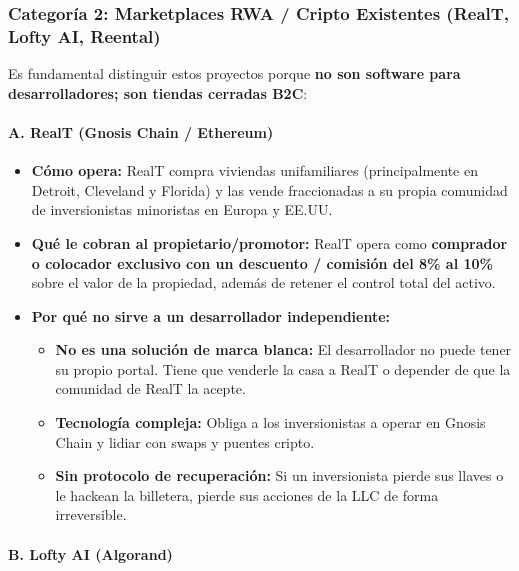 \documentclass[
]{article}
\providecommand{\tightlist}{%
  \setlength{\itemsep}{0pt}\setlength{\parskip}{0pt}}
\begin{document}
\subsubsection{Categoría 2: Marketplaces RWA / Cripto Existentes (RealT,
Lofty AI,
Reental)}\label{categoruxeda-2-marketplaces-rwa-cripto-existentes-realt-lofty-ai-reental}

Es fundamental distinguir estos proyectos porque \textbf{no son software
para desarrolladores; son tiendas cerradas B2C}:

\paragraph{A. RealT (Gnosis Chain /
Ethereum)}\label{a.-realt-gnosis-chain-ethereum}

\begin{itemize}
\tightlist
\item
  \textbf{Cómo opera:} RealT compra viviendas unifamiliares
  (principalmente en Detroit, Cleveland y Florida) y las vende
  fraccionadas a su propia comunidad de inversionistas minoristas en
  Europa y EE.UU.
\item
  \textbf{Qué le cobran al propietario/promotor:} RealT opera como
  \textbf{comprador o colocador exclusivo con un descuento / comisión
  del 8\% al 10\%} sobre el valor de la propiedad, además de retener el
  control total del activo.
\item
  \textbf{Por qué no sirve a un desarrollador independiente:}

  \begin{itemize}
  \tightlist
  \item
    \textbf{No es una solución de marca blanca:} El desarrollador no
    puede tener su propio portal. Tiene que venderle la casa a RealT o
    depender de que la comunidad de RealT la acepte.
  \item
    \textbf{Tecnología compleja:} Obliga a los inversionistas a operar
    en Gnosis Chain y lidiar con swaps y puentes cripto.
  \item
    \textbf{Sin protocolo de recuperación:} Si un inversionista pierde
    sus llaves o le hackean la billetera, pierde sus acciones de la LLC
    de forma irreversible.
  \end{itemize}
\end{itemize}

\paragraph{B. Lofty AI (Algorand)}\label{b.-lofty-ai-algorand}
\end{document}
